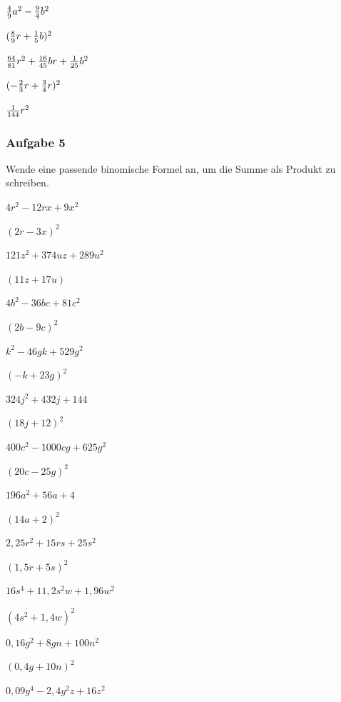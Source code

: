 \documentclass[
  ngerman,
]{book}
\begin{document}
\leavevmode\hypertarget{toggleText94}{}%
\({4 \over 9}a^2-{9 \over 4}b^2\)

\(({8 \over 9}r+{1 \over 5}b)^2\)

\leavevmode\hypertarget{toggleText95}{}%
\({64 \over 81}r^2+{16\over 45}br+{1 \over 25}b^2\)

\((-{2 \over 3}r+{3 \over 4}r)^2\)

\leavevmode\hypertarget{toggleText96}{}%
\({1 \over 144}r^2\)

\hypertarget{aufgabe-5}{%
\subsubsection*{Aufgabe 5}\label{aufgabe-5}}

Wende eine passende binomische Formel an, um die Summe als Produkt zu schreiben.

\(4r^2-12rx+9x^2\)

\leavevmode\hypertarget{toggleText97}{}%
\((2r-3x)^2\)

\(121z^2+374uz+289u^2\)

\leavevmode\hypertarget{toggleText98}{}%
\((11z+17u)\)

\(4b^2-36bc+81c^2\)

\leavevmode\hypertarget{toggleText99}{}%
\((2b-9c)^2\)

\(k^2-46gk+529g^2\)

\leavevmode\hypertarget{toggleText100}{}%
\((-k+23g)^2\)

\(324j^2+432j+144\)

\leavevmode\hypertarget{toggleText101}{}%
\((18j+12)^2\)

\(400c^2-1000cg+625g^2\)

\leavevmode\hypertarget{toggleText102}{}%
\((20c-25g)^2\)

\(196a^2+56a+4\)

\leavevmode\hypertarget{toggleText103}{}%
\((14a+2)^2\)

\(2,25r^2+15rs+25s^2\)

\leavevmode\hypertarget{toggleText104}{}%
\((1,5r+5s)^2\)

\(16s^4+11,2s^2w+1,96w^2\)

\leavevmode\hypertarget{toggleText105}{}%
\((4s^2+1,4w)^2\)

\(0,16g^2+8gn+100n^2\)

\leavevmode\hypertarget{toggleText106}{}%
\((0,4g+10n)^2\)

\(0,09y^4-2,4y^2z+16z^2\)
\end{document}
